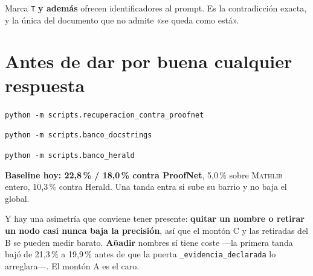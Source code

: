 \documentclass[10pt,a4paper]{article}
\newcommand{\Mathlib}{\textsc{Mathlib}}
\begin{document}
Marca \texttt{T} \textbf{y además} ofrecen identificadores al prompt. Es la
contradicción exacta, y la única del documento que no admite «se queda como
está».
\par\medskip
\newpage
\section*{Antes de dar por buena cualquier respuesta}
\begin{marca}\small

\texttt{python -m scripts.recuperacion\_contra\_proofnet}\par
\texttt{python -m scripts.banco\_docstrings}\par
\texttt{python -m scripts.banco\_herald}\par\medskip
\textbf{Baseline hoy: 22,8\,\% / 18,0\,\% contra ProofNet}, 5,0\,\% sobre
\Mathlib{} entero, 10,3\,\% contra Herald. Una tanda entra si sube su barrio y
no baja el global.\par\medskip
Y hay una asimetría que conviene tener presente: \textbf{quitar un nombre o
retirar un nodo casi nunca baja la precisión}, así que el montón C y las
retiradas del B se pueden medir barato. \textbf{Añadir} nombres sí tiene
coste —la primera tanda bajó de 21,3\,\% a 19,9\,\% antes de que la puerta
\texttt{\_evidencia\_declarada} lo arreglara—. El montón A es el caro.

\end{marca}
\end{document}
